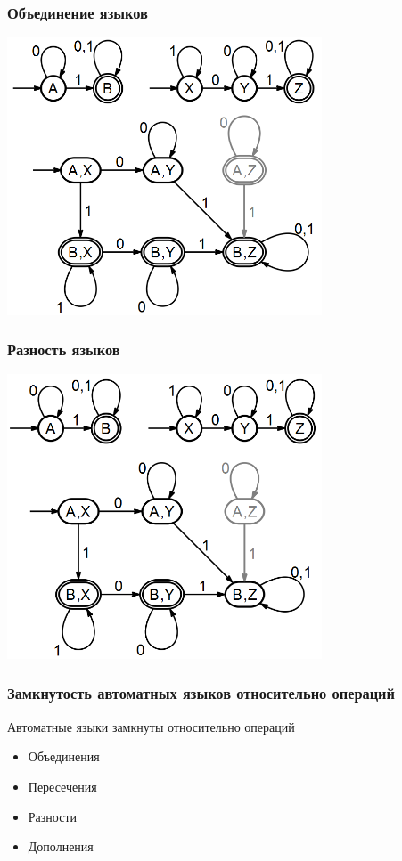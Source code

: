 \documentclass{beamer}
\begin{document}
\begin{frame}[fragile]
  \transwipe[direction=90]
  \frametitle{Объединение языков}
  \begin{center}
  \includegraphics[width=0.7\textwidth]{pics/cup.png}  
  \end{center}
\end{frame}

\begin{frame}[fragile]
  \transwipe[direction=90]
  \frametitle{Разность языков}
  \begin{center}
  \includegraphics[width=0.7\textwidth]{pics/diff.png}  
  \end{center}
\end{frame}

\begin{frame}[fragile]
  \transwipe[direction=90]
  \frametitle{Замкнутость автоматных языков относительно операций}
  Автоматные языки замкнуты относительно операций 
  \begin{itemize}
    \item Объединения
    \item Пересечения
    \item Разности
    \item Дополнения
  \end{itemize}
\end{frame}
\end{document}
